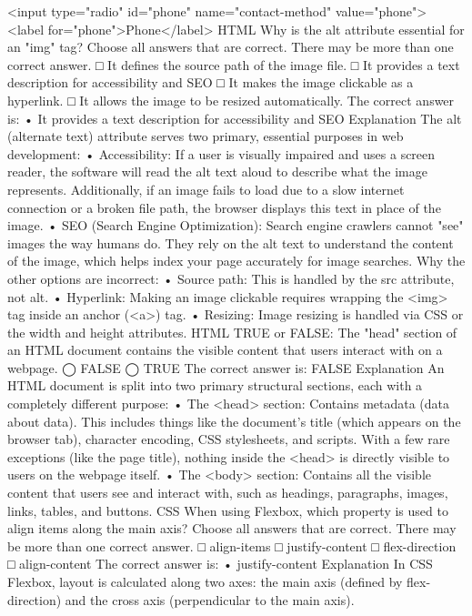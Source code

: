 <input type="radio" id="phone" name="contact-method" value="phone">
<label for="phone">Phone</label>
HTML
Why is the alt attribute essential for an "img" tag?
Choose all answers that are correct. There may be more than one correct answer.
□ It defines the source path of the image file.
□ It provides a text description for accessibility and SEO
□ It makes the image clickable as a hyperlink.
□ It allows the image to be resized automatically.
The correct answer is:
•	It provides a text description for accessibility and SEO
Explanation
The alt (alternate text) attribute serves two primary, essential purposes in web development:
•	Accessibility: If a user is visually impaired and uses a screen reader, the software will read the alt text aloud to describe what the image represents. Additionally, if an image fails to load due to a slow internet connection or a broken file path, the browser displays this text in place of the image.
•	SEO (Search Engine Optimization): Search engine crawlers cannot "see" images the way humans do. They rely on the alt text to understand the content of the image, which helps index your page accurately for image searches.
Why the other options are incorrect:
•	Source path: This is handled by the src attribute, not alt.
•	Hyperlink: Making an image clickable requires wrapping the <img> tag inside an anchor (<a>) tag.
•	Resizing: Image resizing is handled via CSS or the width and height attributes.
HTML
TRUE or FALSE: The "head" section of an HTML document contains the visible content that users interact with on a webpage.
◯ FALSE
◯ TRUE
The correct answer is:
FALSE
Explanation
An HTML document is split into two primary structural sections, each with a completely different purpose:
•	The <head> section: Contains metadata (data about data). This includes things like the document's title (which appears on the browser tab), character encoding, CSS stylesheets, and scripts. With a few rare exceptions (like the page title), nothing inside the <head> is directly visible to users on the webpage itself.
•	The <body> section: Contains all the visible content that users see and interact with, such as headings, paragraphs, images, links, tables, and buttons.
CSS
When using Flexbox, which property is used to align items along the main axis?
Choose all answers that are correct. There may be more than one correct answer.
□ align-items
□ justify-content
□ flex-direction
□ align-content
The correct answer is:
•	justify-content
Explanation
In CSS Flexbox, layout is calculated along two axes: the main axis (defined by flex-direction) and the cross axis (perpendicular to the main axis).
